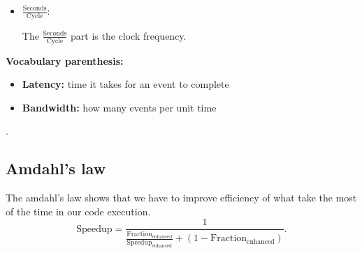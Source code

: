 \begin{itemize}[left=10pt, label=\textbullet]
\begin{tcolorbox}[gris]
\begin{remark}{Remark}
                    We have to be careful! The cycles per instruction (CPI) is a good metric for uniprocessor, but not necessarily for multi processor. In multiprocessors, some core may have to wait for others, to have a specific information or whatever, so when the core wait, it will just do some spinning threads which is very fast $\implies$ a low CPI! But in fact, you don't execute the program particularly faster.
                     
                It is better to use some metric for `` useful work'', like:
                \begin{itemize}[left=10pt]
                    \item Transactions complete per second,
                    \item Request services per second.
                \end{itemize}
                \end{remark}
            \end{tcolorbox} 
        \item \textbf{$\frac{\text{Seconds}}{\text{Cycle}}$}:
            \begin{tcolorbox}[gris]
                The $\frac{\text{Seconds}}{\text{Cycle}}$ part is the clock frequency.             
            \end{tcolorbox}
    \end{itemize}
    \textbf{Vocabulary parenthesis:}
    \begin{tcolorbox}[vert]
        \begin{itemize}[left=10pt, label=\textbullet]
            \item \textbf{Latency:} time it takes for an event to complete 
            \item \textbf{Bandwidth:} how many events per unit time
        \end{itemize}
       .
    \end{tcolorbox}
    
    
\subsection{Amdahl's law}
    \begin{tcolorbox}[rouge]
        The amdahl's law shows that we have to improve efficiency of what take the most of the time in our code execution. 
        \[\text{Speedup}=\frac{1}{\frac{\text{Fraction}_{\text{enhanced}}}{\text{Speedup}_{\text{enhanced}}}+\left(1-\text{Fraction}_{\text{enhanced}}\right)}.\]
    \end{tcolorbox}
    

